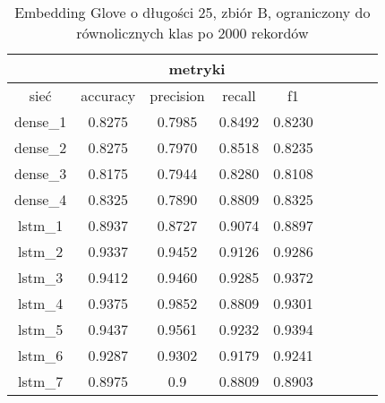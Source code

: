 \begin{table}[h] \label{tab:wyniki_glove_B_lim} \centering
    \caption{Embedding Glove o długości 25, zbiór B, ograniczony do równolicznych klas po 2000 rekordów}
    \label{tab:wyniki_25_eks3}
    \begin{tabular} {|c|c|c|c|c|c|c|c|c| }    \hline
                 & \multicolumn{4}{c|}{metryki}                                                                                        \\ \hline
        sieć     & accuracy                     & precision                  & recall                     & f1                         \\ \hline
        dense\_1 & 0.8275                       & 0.7985                     & 0.8492                     & 0.8230                     \\ \hline
        dense\_2 & 0.8275                       & 0.7970                     & 0.8518                     & 0.8235                     \\ \hline
        dense\_3 & 0.8175                       & 0.7944                     & 0.8280                     & 0.8108                     \\ \hline
        dense\_4 & 0.8325                       & 0.7890                     & 0.8809                     & 0.8325                     \\ \hline
        lstm\_1  & 0.8937                       & 0.8727                     & 0.9074                     & 0.8897                     \\ \hline
        lstm\_2  & 0.9337                       & 0.9452                     & 0.9126                     & 0.9286                     \\ \hline
        lstm\_3  & 0.9412                       & 0.9460                     & 0.9285                     & 0.9372                     \\ \hline
        lstm\_4  & 0.9375                       & 0.9852                     & 0.8809                     & 0.9301                     \\ \hline
        lstm\_5  & 0.9437                       & 0.9561                     & 0.9232                     & 0.9394                     \\ \hline
        lstm\_6  & 0.9287                       & 0.9302                     & 0.9179                     & 0.9241                     \\ \hline
        lstm\_7  & 0.8975                       & 0.9                        & 0.8809                     & 0.8903                     \\ \hline

\end{tabular}
\end{table}
